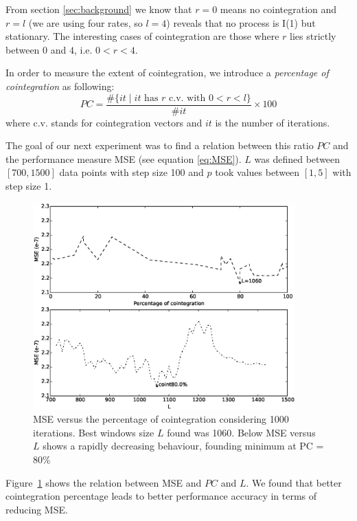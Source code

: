 From section \ref{sec:background} we know that $r=0$ means no cointegration and
$r=l$ (we are using four rates, so $l=4$) reveals that no process is I(1) but
stationary.  The interesting cases of cointegration are those where $r$ lies
strictly between $0$ and $4$, i.e. $0<r<4$.

In order to measure the extent of cointegration, we introduce a
{\em percentage of cointegration\/} as following:
\begin{equation} \label{eq:pcoint}
PC = 
\frac{\#\{ it \mid \text{$it$ has $r$ c.v. with $0<r<l$}\}}
     {\#it}\times 100
\end{equation}
where c.v. stands for cointegration vectors and $it$ is the number of iterations.

The goal of our next experiment was to find a relation between this ratio $PC$
and the performance measure MSE (see equation \ref{eq:MSE}). $L$ was defined
between $[700,1500]$ data points with step size 100 and $p$ took values between
$[1,5]$ with step size 1.  

\begin{figure}[ht!]
  \centering
  \includegraphics[width=0.9\textwidth]{img/Fig2}
  \caption{MSE versus the percentage of cointegration considering 1000
  iterations. Best windows size $L$ found was 1060. Below MSE versus $L$ shows a
  rapidly decreasing behaviour, founding minimum at PC = 80\% }
  \label{fig:cointvsmse}
\end{figure}

Figure~\ref{fig:cointvsmse} shows the relation between MSE and $PC$ and $L$.  We
found that better cointegration percentage leads to better performance accuracy
in terms of reducing MSE.

